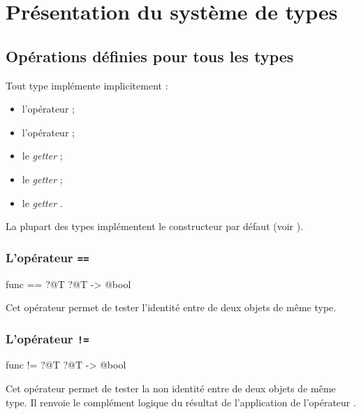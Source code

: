 
\chapter{Présentation du système de types}






\section{Opérations définies pour tous les types}

Tout type implémente implicitement :
\begin{itemize}
  \item l'opérateur \galgas{==} ;
  \item l'opérateur \galgas{\!=} ;
  \item le \emph{getter}  ;
  \item le \emph{getter}  ;
  \item le \emph{getter} .
\end{itemize}

La plupart des types implémentent le constructeur par défaut  (voir ). 


\subsection{L'opérateur \texttt{==}}

\begin{galgascode}
func == ?@T ?@T -> @bool
\end{galgascode}

Cet opérateur permet de tester l'identité entre de deux objets de même type. 

\subsection{L'opérateur \texttt{!=}}

\begin{galgascode}
func != ?@T ?@T -> @bool
\end{galgascode}

Cet opérateur permet de tester la non identité entre de deux objets de même type. Il renvoie le complément logique du résultat de l'application de l'opérateur \galgas{==}.





